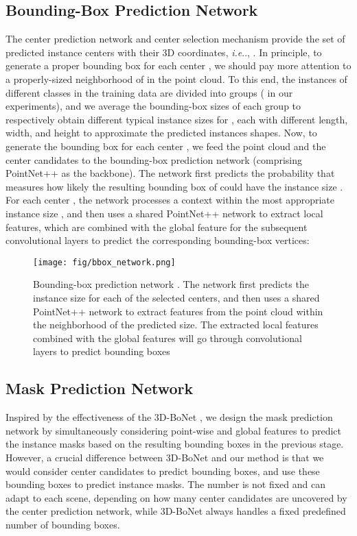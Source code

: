 \documentclass[runningheads]{llncs}
\makeatletter
\DeclareRobustCommand\onedot{\futurelet\@let@token\@onedot}
\def\@onedot{\ifx\@let@token.\else.\null\fi\xspace}
\def\ie{\emph{i.e}\onedot} \def\Ie{\emph{I.e}\onedot}
\makeatother
\begin{document}
\subsection{Bounding-Box Prediction Network } \label{bbox_network}
The center prediction network and center selection mechanism provide the set of  predicted instance centers with their 3D coordinates, \ie, . In principle, to generate a proper bounding box for each center , we should pay more attention to a properly-sized neighborhood of  in the point cloud. To this end, the instances of different classes in the training data are divided into  groups ( in our experiments), and we average the bounding-box sizes of each group to respectively obtain  different typical instance sizes  for , each with different length, width, and height to approximate the predicted instances shapes. Now, to generate the bounding box for each center , we feed the point cloud  and the center candidates  to the bounding-box prediction network  (comprising PointNet++ as the backbone). The network first predicts the probability  that measures how likely the resulting bounding box of  could have the instance size .
For each center , the network  processes a context within the most appropriate instance size , and then uses a shared PointNet++ network to extract local features, which are combined with the global feature for the subsequent convolutional layers to predict the corresponding bounding-box vertices:



\begin{figure*}[tb]
\begin{center}
 \texttt{[image: fig/bbox\_network.png]}
 \vspace{-3mm}
   \caption{Bounding-box prediction network . The network first predicts the instance size for each of the  selected centers, and then uses a shared PointNet++ network to extract features from the point cloud within the neighborhood of the predicted size. The extracted local features combined with the global features will go through convolutional layers to predict  bounding boxes}
\label{fig:Multi_encoding_network}
\end{center}
\end{figure*}


\subsection{Mask Prediction Network }
\label{sec:mpn}
Inspired by the effectiveness of the 3D-BoNet \cite{YangWCHWMT19}, we design the mask prediction network  by simultaneously considering point-wise and global features to predict the instance masks based on the resulting bounding boxes in the previous stage. However, a crucial difference between 3D-BoNet and our method is that we would consider  center candidates to predict  bounding boxes, and use these bounding boxes to predict  instance masks. The number  is not fixed and can adapt to each scene, depending on how many center candidates are uncovered by the center prediction network, while 3D-BoNet always handles a fixed predefined number of bounding boxes.
\end{document}
